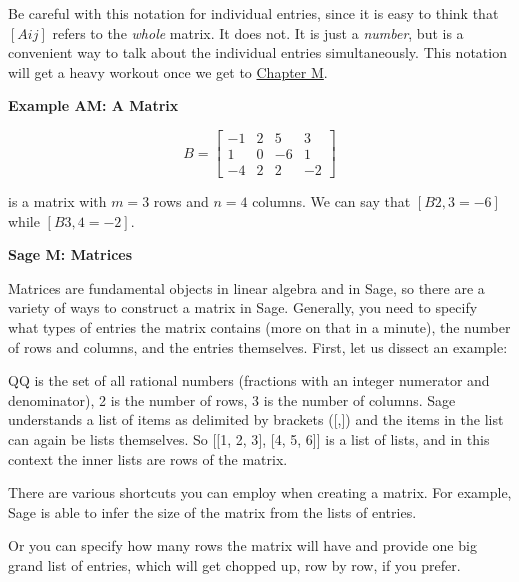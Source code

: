 \documentclass[openany]{book}
\begin{document}
Be careful with this notation for individual entries, since it is easy
to think that \([{A}{ij}]\) refers to the \emph{whole} matrix. It does
not. It is just a \emph{number}, but is a convenient way to talk about
the individual entries simultaneously. This notation will get a heavy
workout once we get to
\href{http://linear.ups.edu/html/chapter-M.html}{Chapter M}.

\textbf{Example AM: A Matrix}

\[B=\begin{bmatrix}
-1&2&5&3\\
1&0&-6&1\\
-4&2&2&-2
\end{bmatrix}\]

is a matrix with \(m=3\) rows and \(n=4\) columns. We can say that
\([{B}{2,3}=-6]\) while \([{B}{3,4}=-2]\).

\textbf{Sage M: Matrices}

Matrices are fundamental objects in linear algebra and in Sage, so there
are a variety of ways to construct a matrix in Sage. Generally, you need
to specify what types of entries the matrix contains (more on that in a
minute), the number of rows and columns, and the entries themselves.
First, let us dissect an example:

\begin{compute}
\end{compute}

QQ is the set of all rational numbers (fractions with an integer
numerator and denominator), 2 is the number of rows, 3 is the number of
columns. Sage understands a list of items as delimited by brackets
({[},{]}) and the items in the list can again be lists themselves. So
{[}{[}1, 2, 3{]}, {[}4, 5, 6{]}{]} is a list of lists, and in this
context the inner lists are rows of the matrix.

There are various shortcuts you can employ when creating a matrix. For
example, Sage is able to infer the size of the matrix from the lists of
entries.

\begin{compute}
\end{compute}

Or you can specify how many rows the matrix will have and provide one
big grand list of entries, which will get chopped up, row by row, if you
prefer.

\begin{compute}
\end{compute}
\end{document}
